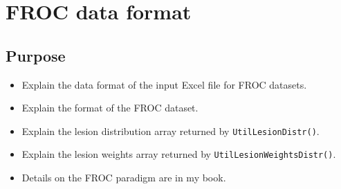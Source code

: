 \documentclass[]{book}
\newenvironment{Shaded}{\begin{snugshade}}{\end{snugshade}}
\newcommand{\CommentTok}[1]{\textcolor[rgb]{0.56,0.35,0.01}{\textit{#1}}}
\newcommand{\DecValTok}[1]{\textcolor[rgb]{0.00,0.00,0.81}{#1}}
\newcommand{\KeywordTok}[1]{\textcolor[rgb]{0.13,0.29,0.53}{\textbf{#1}}}
\newcommand{\NormalTok}[1]{#1}
\newcommand{\OperatorTok}[1]{\textcolor[rgb]{0.81,0.36,0.00}{\textbf{#1}}}
\newcommand{\StringTok}[1]{\textcolor[rgb]{0.31,0.60,0.02}{#1}}
\providecommand{\tightlist}{%
  \setlength{\itemsep}{0pt}\setlength{\parskip}{0pt}}
\begin{document}
\begin{Shaded}
\end{Shaded}

\hypertarget{frocdataformat}{%
\chapter{FROC data format}\label{frocdataformat}}

\hypertarget{purpose}{%
\section{Purpose}\label{purpose}}

\begin{itemize}
\tightlist
\item
  Explain the data format of the input Excel file for FROC datasets.
\item
  Explain the format of the FROC dataset.
\item
  Explain the lesion distribution array returned by \texttt{UtilLesionDistr()}.
\item
  Explain the lesion weights array returned by \texttt{UtilLesionWeightsDistr()}.
\item
  Details on the FROC paradigm are in my book.
\end{itemize}
\end{document}
